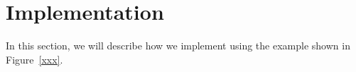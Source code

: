 \section{Implementation}
\label{sec:imple}

In this section, we will describe how we implement \Tool{} 
using the example shown in Figure~\ref{xxx}. 

